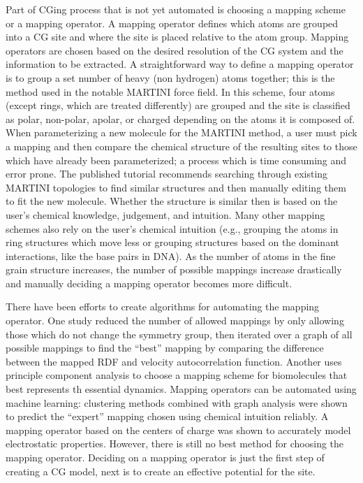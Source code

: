 Part of CGing process that is not yet automated is choosing a mapping scheme or a mapping operator.
A mapping operator defines which atoms are grouped into a CG site and where the site is placed relative to the atom group.
Mapping operators are chosen based on the desired resolution of the CG system and the information to be extracted.
A straightforward way to define a mapping operator is to group a set number of heavy (non hydrogen) atoms together; this is the method used in the notable MARTINI force field\cite{Marrink2007}.
In this scheme, four atoms (except rings, which are treated differently) are grouped and the site is classified as polar, non-polar, apolar, or charged depending on the atoms it is composed of.
When parameterizing a new molecule for the MARTINI method, a user must pick a mapping and then compare the chemical structure of the resulting sites to those which have already been parameterized; a process which is time consuming and error prone\cite{martini-tutorial}.
The published tutorial recommends searching through existing MARTINI topologies to find similar structures and then manually editing them to fit the new molecule.
Whether the structure is similar then is based on the user's chemical knowledge, judgement, and intuition.
Many other mapping schemes also rely on the user's chemical intuition (e.g., grouping the atoms in ring structures which move less or grouping structures based on the dominant interactions, like the base pairs in DNA)\cite{Huang2010, Knotts2007}.
As the number of atoms in the fine grain structure increases, the number of possible mappings increase drastically and manually deciding a mapping operator becomes more difficult.

There have been efforts to create algorithms for automating the mapping operator.
One study reduced the number of allowed mappings by only allowing those which do not change the symmetry group, then iterated over a graph of all possible mappings to find the ``best'' mapping by comparing the difference between the mapped RDF and velocity autocorrelation function\cite{Chakraborty2018b}.
Another uses principle component analysis to choose a mapping scheme for biomolecules that best represents th essential dynamics\cite{Zhang2008}.
Mapping operators can be automated using machine learning: clustering methods combined with graph analysis were shown to predict the ``expert'' mapping chosen using chemical intuition reliably\cite{Li2020}. 
A mapping operator based on the centers of charge was shown to accurately model electrostatic properties\cite{Cao2015a}.
However, there is still no best method for choosing the mapping operator.
Deciding on a mapping operator is just the first step of creating a CG model, next is to create an effective potential for the site.

